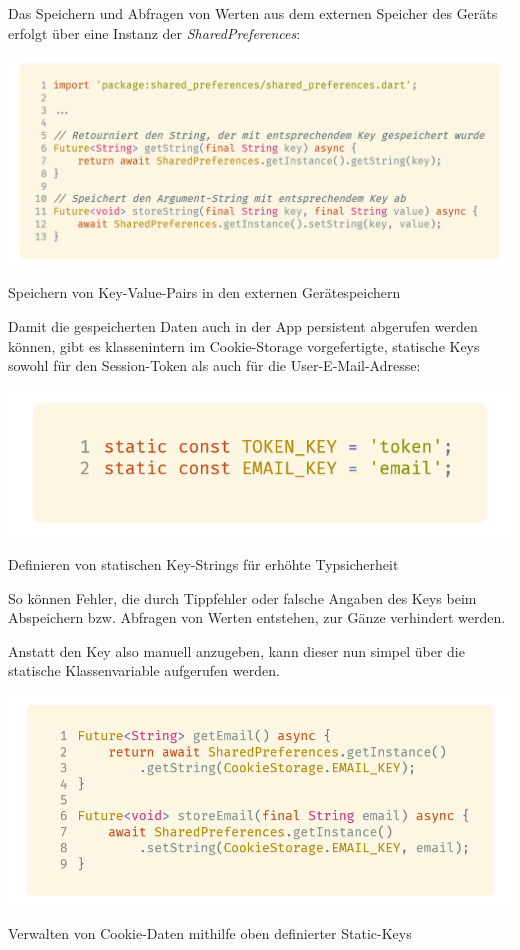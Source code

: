Das Speichern und Abfragen von Werten aus dem externen Speicher des Geräts erfolgt über eine Instanz der \textit{SharedPreferences}:

\begin{code}[H]
    \centering
    \includegraphics[width=1\textwidth]{images/Client/util/cookie-storage/sharedPreferences.png}
    \vspace{-25pt}
    \caption{Speichern von Key-Value-Pairs in den externen Gerätespeichern}
\end{code}

Damit die gespeicherten Daten auch in der App persistent abgerufen werden können, gibt es klassenintern
im Cookie-Storage vorgefertigte, statische Keys sowohl für den Session-Token als auch für die User-E-Mail-Adresse:

\begin{code}
    \centering
    \includegraphics[width=1\textwidth]{images/Client/util/cookie-storage/cookieKeys.png}
    \vspace{-25pt}
    \caption{Definieren von statischen Key-Strings für erhöhte Typsicherheit}
\end{code}

So können Fehler, die durch Tippfehler oder falsche Angaben des Keys beim Abspeichern bzw. Abfragen
von Werten entstehen, zur Gänze verhindert werden.

Anstatt den Key also manuell anzugeben, kann dieser nun simpel über die statische Klassenvariable
aufgerufen werden.

\begin{code}
    \centering
    \includegraphics[width=1\textwidth]{images/Client/util/cookie-storage/getAndStoreWithStaticKey.png}
    \vspace{-25pt}
    \caption{Verwalten von Cookie-Daten mithilfe oben definierter Static-Keys}
\end{code}